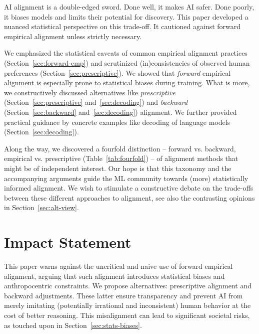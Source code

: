 \documentclass{article}
\theoremstyle{plain}
\theoremstyle{definition}
\theoremstyle{remark}
\begin{document}

AI alignment is a double-edged sword. Done well, it makes AI safer. Done poorly, it biases models and limits their potential for discovery.
This paper developed a nuanced statistical perspective on this trade-off. It cautioned against forward empirical alignment unless strictly necessary. 

We emphasized the statistical caveats of common empirical alignment practices (Section~\ref{sec:forward-emp}) and scrutinized (in)consistencies of observed human preferences (Section~\ref{sec:prescriptive}). We showed that \textit{forward} empirical alignment is especially prone to  statistical biases during training. What is more, we constructively discussed alternatives like \textit{prescriptive} (Section~\ref{sec:prescriptive} and~\ref{sec:decoding}) and \textit{backward} (Section~\ref{sec:backward} and~\ref{sec:decoding}) alignment. We further provided practical guidance by concrete examples like decoding of language models (Section~\ref{sec:decoding}).

Along the way, we discovered a fourfold distinction -- forward vs. backward, empirical vs. prescriptive (Table~\ref{tab:fourfold}) -- of alignment methods that might be of independent interest. Our hope is that this taxonomy and the accompanying arguments guide the ML community towards (more) statistically informed alignment. %
We wish to stimulate a constructive debate on the trade-offs between these different approaches to alignment, see also the contrasting opinions in Section~\ref{sec:alt-view}.  




     



\section{Impact Statement}

This paper warns against the uncritical and naive use of forward empirical alignment, arguing that such alignment introduces statistical biases and anthropocentric constraints. We propose alternatives: prescriptive alignment and backward adjustments. These latter ensure transparency and prevent AI from merely imitating (potentially irrational and inconsistent) human behavior at the cost of better reasoning. This misalignment can lead to significant societal risks, as touched upon in Section~\ref{sec:stats-biases}. 
\end{document}
